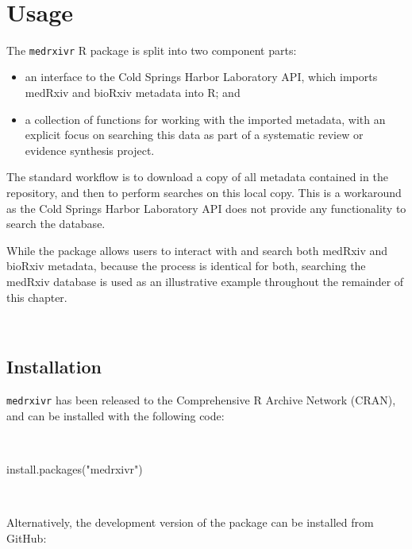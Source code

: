 \documentclass[a4paper, twoside]{templates/ociamthesis}
\providecommand{\tightlist}{%
  \setlength{\itemsep}{0pt}\setlength{\parskip}{0pt}}
\newenvironment{Shaded}{\begin{snugshade}}{\end{snugshade}}
\newcommand{\FunctionTok}[1]{\textcolor[rgb]{0.00,0.00,0.00}{#1}}
\newcommand{\NormalTok}[1]{#1}
\newcommand{\StringTok}[1]{\textcolor[rgb]{0.31,0.60,0.02}{#1}}
\renewenvironment{Shaded}
{
  \vspace{4pt}%
  \begin{snugshade}%
}{%
  \end{snugshade}%
  \vspace{4pt}%
}
\begin{document}
~

\hypertarget{usage}{%
\section{Usage}\label{usage}}

The \texttt{medrxivr} R package is split into two component parts:

\begin{itemize}
\tightlist
\item
  an interface to the Cold Springs Harbor Laboratory API, which imports medRxiv and bioRxiv metadata into R; and
\item
  a collection of functions for working with the imported metadata, with an explicit focus on searching this data as part of a systematic review or evidence synthesis project.
\end{itemize}

The standard workflow is to download a copy of all metadata contained in the repository, and then to perform searches on this local copy. This is a workaround as the Cold Springs Harbor Laboratory API does not provide any functionality to search the database.

While the package allows users to interact with and search both medRxiv and bioRxiv metadata, because the process is identical for both, searching the medRxiv database is used as an illustrative example throughout the remainder of this chapter.

~

\hypertarget{installation}{%
\subsection{Installation}\label{installation}}

\texttt{medrxivr} has been released to the Comprehensive R Archive Network (CRAN), and can be installed with the following code:

~

\begin{Shaded}
\begin{Highlighting}[]
\FunctionTok{install.packages}\NormalTok{(}\StringTok{"medrxivr"}\NormalTok{)}
\end{Highlighting}
\end{Shaded}

~

Alternatively, the development version of the package can be installed from GitHub:

~
\end{document}
